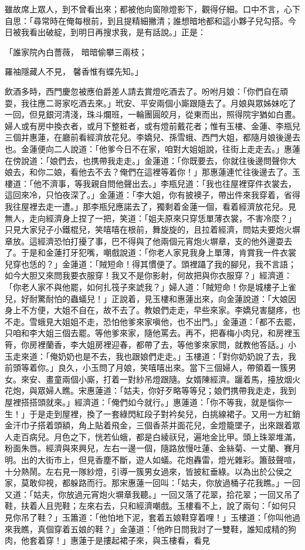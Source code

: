 雖故席上眾人，到不曾看出來；都被他向窗隙燈影下，觀得仔細。口中不言，心下自思：「尋常時在俺每根前，到且提精細撇清；誰想暗地都和這小夥子兒勾搭。今日被我看出破綻，到明日再搜求我，是有話說。」正是：

「誰家院內白薔薇，  暗暗偷攀三兩枝；

羅袖隱藏人不見，  馨香惟有蝶先知。」

飲酒多時，西門慶忽被應伯爵差人請去賞燈吃酒去了。吩咐月娘：「你們自在頑耍，我往應二哥家吃酒去來。」玳安、平安兩個小廝跟隨去了。月娘與眾姊妹吃了一回，但見銀河清淺，珠斗爛班，一輪團圓皎月，從東而出，照得院宇猶如白晝。婦人或有房中換衣者，或月下整粧者，或有燈前戴花者；惟有玉樓、金蓮、李瓶兒三個并惠蓮，在廳前看經濟放花兒。李嬌兒、孫雪蛾、西門大姐，都隨月娘後邊去也。金蓮便向二人說道：「他爹今日不在家，咱對大姐姐說，往街上走走去。」惠蓮在傍說道：「娘們去，也携帶我走走。」金蓮道：「你既要去，你就往後邊問聲你大娘去，和你二娘，看他去不去？俺們在這裡等着你！」那惠蓮連忙往後邊去了。玉樓道：「他不濟事，等我親自問他聲出去。」李瓶兒道：「我也往屋裡穿件衣裳去，這回來冷，只怕夜深了。」金蓮道：「李大姐，你有披襖子，帶出件來我穿着，省得我往屋裡去走一遭。」那李瓶兒應諾去了，獨剩着金蓮一個，看着經濟放花兒。見無人，走向經濟身上捏了一把，笑道：「姐夫原來只穿恁單薄衣裳，不害冷麼？」只見大家兒子小鐵棍兒，笑嘻嘻在根前，舞旋旋的，且拉着經濟，問姑夫要炮火塀章放。這經濟恐怕打擾了事，巴不得與了他兩個元宵炮火塀章，支的他外邊耍去了。于是和金蓮打牙犯嘴，嘲戲說道：「你老人家見我身上單薄，肯賞我一件衣裳兒穿也恁的？」金蓮道：「賊短命！得其慣便了。頭裡躡了我的腳兒，我不言語；如今大胆又來問我要衣服穿！我又不是你影射，何故把與你衣服穿？」經濟道：「你老人家不與他罷，如何扎筏子來諕我？」婦人道：「賊短命！你是城樓子上雀兒，好耐驚耐怕的蟲蟻兒！」正說着，見玉樓和惠蓮出來，向金蓮說道：「大娘因身上不方便，大姐不自在，故不去了。教娘們走走，早些來家。李嬌兒害腿疼，也不走。雪蛾見大姐姐不走，恐怕他爹來家嗔他，也不出門。」金蓮道：「都不去罷，只咱和李大姐三個去罷。等他爹來家，隨他罵去。再不，把春梅小肉兒，和房裡玉筲，你房裡蘭香，李大姐房裡迎春，都帶了去，等他爹來家問，就教他答話。」小玉走來道：「俺奶奶也是不去，我也跟娘們走走。」玉樓道：「對你奶奶說了去，我前頭等着你。」良久，小玉問了月娘，笑嘻嘻出來。當下三個婦人，帶領着一簇男女。來安、畫童兩個小廝，打着一對紗吊燈跟隨。女婿陳經濟。躧着馬，擡放烟火花炮，與眾婦人瞧。宋惠蓮道：「姑夫，你好歹略等等兒；娘們携帶我走走，我到屋裡搭搭頭就來。」經濟道：「俺們如今就行。」惠蓮道：「你不等我，就是惱你一生！」于是走到屋裡，換了一套綠閃紅段子對衿矣兒，白挑線裙子。又用一方紅銷金汗巾子搭着頭額，角上貼着飛金，三個香茶并面花兒，金燈籠墜子，出來跟着眾人走百病兒。月色之下，恍若仙蛾，都是白綾祆兒，遍地金比甲。頭上珠翠堆滿，粉面朱唇。經濟與來興兒，左右一邊一個，隨路放慢吐蓮、金絲菊、一丈蘭、賽月明。出的大街市上，但見香塵不斷，遊人如蟻。花炮轟雷，燈光雜彩。簫鼓聲喧，十分熱鬧。左右見一隊紗燈，引導一簇男女過來，皆披紅垂綠。以為出於公侯之家，莫敢仰視，都躲路而行。那宋惠蓮一回叫：「姑夫，你放過桶子花我瞧。」一回又道：「姑夫，你放過元宵炮火塀章我聽。」一回又落了花翠，拾花翠；一回又吊了鞋，扶着人且兜鞋；左來右去，只和經濟嘲戲。玉樓看不上，說了兩句：「如何只見你吊了鞋？」玉簫道：「他怕地下泥，套着五娘鞋穿着哩！」玉樓道：「你叫他過來我瞧，真個穿着五娘的鞋？」金蓮道：「他昨日問我討了一雙鞋，誰知成精的狗肉，他套着穿！」惠蓮于是摟起裙子來，與玉樓看，看見